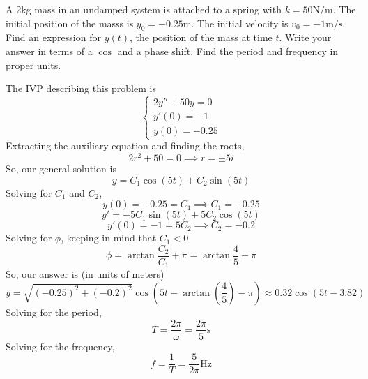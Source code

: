 \begin{example}
	A 2kg mass in an undamped system is attached to a spring with $k = 50 \text{N/m}$. The initial position of the masss is $y_0 = -0.25\text{m}$. The initial velocity is $v_0 = -1\text{m/s}$. Find an expression for $y(t)$, the position of the mass at time $t$. Write your answer in terms of a $\cos$ and a phase shift. Find the period and frequency in proper units.
\end{example}
The IVP describing this problem is
\begin{equation*}
	\begin{cases}
		2y'' + 50y = 0 \\
		y'(0) = -1 \\
		y(0) = -0.25
	\end{cases}
\end{equation*}
Extracting the auxiliary equation and finding the roots,
\begin{equation*}
	2r^2 + 50 = 0 \implies r = \pm 5i
\end{equation*}
So, our general solution is
\begin{equation*}
	y = C_1\cos{(5t)} + C_2\sin{(5t)}
\end{equation*}
Solving for $C_1$ and $C_2$,
\begin{equation*}
	y(0) = -0.25 = C_1 \implies C_1 = -0.25
\end{equation*}
\begin{equation*}
	y' = -5C_1\sin{(5t)} + 5C_2\cos{(5t)}
\end{equation*}
\begin{equation*}
	y'(0) = -1 = 5C_2 \implies C_2 = -0.2
\end{equation*}
Solving for $\phi$, keeping in mind that $C_1 < 0$
\begin{equation*}
	\phi = \arctan{\frac{C_2}{C_1}} + \pi = \arctan{\frac{4}{5}} + \pi
\end{equation*}
So, our answer is (in units of meters)
\begin{equation*}
	y = \sqrt{(-0.25)^2 + (-0.2)^2}\cos{\left(5t - \arctan{\left(\frac{4}{5}\right)} - \pi\right)} \approx 0.32\cos{\left(5t - 3.82\right)}
\end{equation*}
Solving for the period,
\begin{equation*}
	T = \frac{2\pi}{\omega} = \frac{2\pi}{5} \text{s}
\end{equation*}
Solving for the frequency,
\begin{equation*}
	f = \frac{1}{T} = \frac{5}{2\pi} \text{Hz}
\end{equation*}